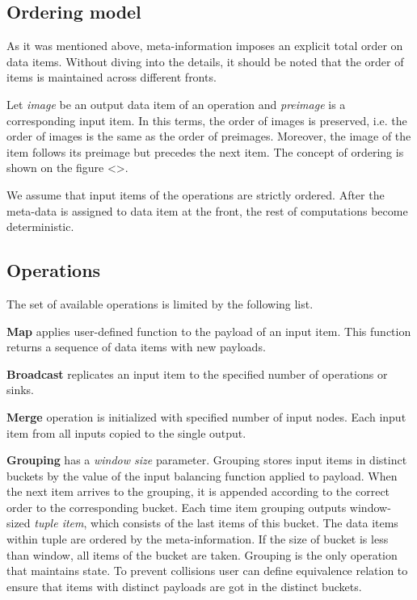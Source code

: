\subsection{Ordering model}

As it was mentioned above, meta-information imposes an explicit total order on data items. Without diving into the details, it should be noted that the order of items is maintained across different fronts.

Let {\it image} be an output data item of an operation and {\it preimage} is a corresponding input item. In this terms, the order of images is preserved, i.e. the order of images is the same as the order of preimages. Moreover, the image of the item follows its preimage but precedes the next item. The concept of ordering is shown on the figure <>.

We assume that input items of the operations are strictly ordered. After the meta-data is assigned to data item at the front, the rest of computations become deterministic.

\subsection{Operations}

The set of available operations is limited by the following list.

{\bf Map} applies user-defined function to the payload of an input item. This function returns a sequence of data items with new payloads.

{\bf Broadcast} replicates an input item to the specified number of operations or sinks. 

{\bf Merge} operation is initialized with specified number of input nodes. Each input item from all inputs copied to the single output.

{\bf Grouping} has a {\it window size} parameter. Grouping stores input items in distinct buckets by the value of the input balancing function applied to payload. When the next item arrives to the grouping, it is appended according to the correct order to the corresponding bucket. Each time item grouping outputs window-sized {\it tuple item}, which consists of the last items of this bucket. The data items within tuple are ordered by the meta-information. If the size of bucket is less than window, all items of the bucket are taken. Grouping is the only operation that maintains state. To prevent collisions user can define equivalence relation to ensure that items with distinct payloads are got in the distinct buckets.

